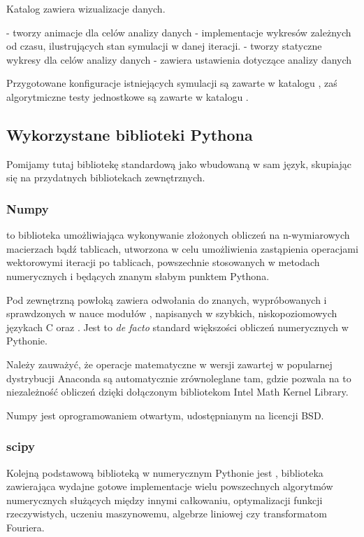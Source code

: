 Katalog  zawiera wizualizacje danych.
\begin{itemize}
    \itemi {} - tworzy animacje dla celów analizy danych
    \itemi {} - implementacje wykresów zależnych od czasu, ilustrujących stan symulacji w danej iteracji.
    \itemi {} - tworzy statyczne wykresy dla celów analizy danych
    \itemi {} - zawiera ustawienia dotyczące analizy danych
\end{itemize}

Przygotowane konfiguracje istniejących symulacji są zawarte w katalogu 
, zaś algorytmiczne testy jednostkowe są zawarte w katalogu .

\subsection{Wykorzystane biblioteki Pythona}

Pomijamy tutaj bibliotekę standardową jako wbudowaną w sam język, skupiając się na przydatnych bibliotekach zewnętrznych.

\subsubsection{Numpy}
\cite{numpy} to biblioteka umożliwiająca wykonywanie złożonych obliczeń na
n-wymiarowych macierzach bądź tablicach, utworzona w celu umożliwienia
zastąpienia operacjami wektorowymi iteracji po tablicach, powszechnie
stosowanych w metodach numerycznych i będących znanym słabym punktem
Pythona.

Pod zewnętrzną powłoką zawiera odwołania do znanych, wypróbowanych i
sprawdzonych w nauce modułów ,  napisanych w
szybkich, niskopoziomowych językach C oraz .  Jest to
\emph{de facto} standard większości obliczeń numerycznych w Pythonie.

Należy zauważyć, że operacje matematyczne w wersji  zawartej
w popularnej dystrybucji Anaconda są automatycznie zrównoleglane tam, gdzie
pozwala na to niezależność obliczeń dzięki dołączonym bibliotekom Intel Math
Kernel Library.\cite{intel-mkl} 

Numpy jest oprogramowaniem otwartym, udostępnianym na licencji BSD.


\subsubsection{scipy}
Kolejną podstawową biblioteką w numerycznym Pythonie jest \cite{scipy},
biblioteka zawierająca wydajne gotowe implementacje wielu powszechnych algorytmów
numerycznych służących między innymi całkowaniu, optymalizacji funkcji rzeczywistych,
uczeniu maszynowemu, algebrze liniowej czy transformatom Fouriera.

